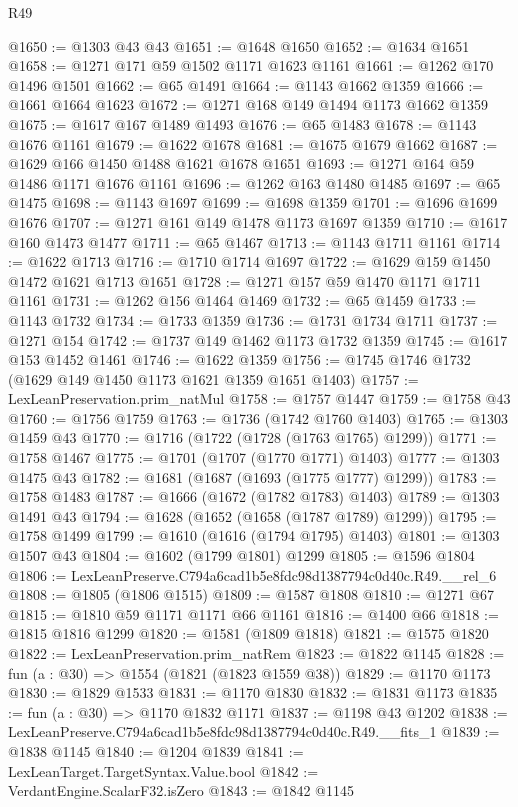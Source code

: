 \begin{lexlean}{R49}
\begin{coremodule}
@1650 := @1303 @43 @43
@1651 := @1648 @1650
@1652 := @1634 @1651
@1658 := @1271 @171 @59 @1502 @1171 @1623 @1161
@1661 := @1262 @170 @1496 @1501
@1662 := @65 @1491
@1664 := @1143 @1662 @1359
@1666 := @1661 @1664 @1623
@1672 := @1271 @168 @149 @1494 @1173 @1662 @1359
@1675 := @1617 @167 @1489 @1493
@1676 := @65 @1483
@1678 := @1143 @1676 @1161
@1679 := @1622 @1678
@1681 := @1675 @1679 @1662
@1687 := @1629 @166 @1450 @1488 @1621 @1678 @1651
@1693 := @1271 @164 @59 @1486 @1171 @1676 @1161
@1696 := @1262 @163 @1480 @1485
@1697 := @65 @1475
@1698 := @1143 @1697
@1699 := @1698 @1359
@1701 := @1696 @1699 @1676
@1707 := @1271 @161 @149 @1478 @1173 @1697 @1359
@1710 := @1617 @160 @1473 @1477
@1711 := @65 @1467
@1713 := @1143 @1711 @1161
@1714 := @1622 @1713
@1716 := @1710 @1714 @1697
@1722 := @1629 @159 @1450 @1472 @1621 @1713 @1651
@1728 := @1271 @157 @59 @1470 @1171 @1711 @1161
@1731 := @1262 @156 @1464 @1469
@1732 := @65 @1459
@1733 := @1143 @1732
@1734 := @1733 @1359
@1736 := @1731 @1734 @1711
@1737 := @1271 @154
@1742 := @1737 @149 @1462 @1173 @1732 @1359
@1745 := @1617 @153 @1452 @1461
@1746 := @1622 @1359
@1756 := @1745 @1746 @1732 (@1629 @149 @1450 @1173 @1621 @1359 @1651 @1403)
@1757 := LexLeanPreservation.prim_natMul
@1758 := @1757 @1447
@1759 := @1758 @43
@1760 := @1756 @1759
@1763 := @1736 (@1742 @1760 @1403)
@1765 := @1303 @1459 @43
@1770 := @1716 (@1722 (@1728 (@1763 @1765) @1299))
@1771 := @1758 @1467
@1775 := @1701 (@1707 (@1770 @1771) @1403)
@1777 := @1303 @1475 @43
@1782 := @1681 (@1687 (@1693 (@1775 @1777) @1299))
@1783 := @1758 @1483
@1787 := @1666 (@1672 (@1782 @1783) @1403)
@1789 := @1303 @1491 @43
@1794 := @1628 (@1652 (@1658 (@1787 @1789) @1299))
@1795 := @1758 @1499
@1799 := @1610 (@1616 (@1794 @1795) @1403)
@1801 := @1303 @1507 @43
@1804 := @1602 (@1799 @1801) @1299
@1805 := @1596 @1804
@1806 := LexLeanPreserve.C794a6cad1b5e8fdc98d1387794c0d40c.R49.__rel_6
@1808 := @1805 (@1806 @1515)
@1809 := @1587 @1808
@1810 := @1271 @67
@1815 := @1810 @59 @1171 @1171 @66 @1161
@1816 := @1400 @66
@1818 := @1815 @1816 @1299
@1820 := @1581 (@1809 @1818)
@1821 := @1575 @1820
@1822 := LexLeanPreservation.prim_natRem
@1823 := @1822 @1145
@1828 := fun (a : @30) => @1554 (@1821 (@1823 @1559 @38))
@1829 := @1170 @1173
@1830 := @1829 @1533
@1831 := @1170 @1830
@1832 := @1831 @1173
@1835 := fun (a : @30) => @1170 @1832 @1171
@1837 := @1198 @43 @1202
@1838 := LexLeanPreserve.C794a6cad1b5e8fdc98d1387794c0d40c.R49.__fits_1
@1839 := @1838 @1145
@1840 := @1204 @1839
@1841 := LexLeanTarget.TargetSyntax.Value.bool
@1842 := VerdantEngine.ScalarF32.isZero
@1843 := @1842 @1145

\end{coremodule}
\end{lexlean}
